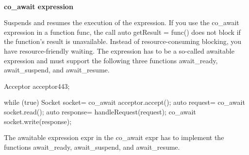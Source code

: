 \noindent
\\\textbf{co\_await expression}

Suspends and resumes the execution of the expression. If you use the co\_await expression in a function func, the call auto getResult = func() does not block if the function’s result is unavailable. Instead of resource-consuming blocking, you have resource-friendly waiting. The expression has to be a so-called awaitable expression and must support the following three functions await\_ready, await\_suspend, and await\_resume.


\begin{cpp}
Acceptor acceptor{443};

while (true){
	Socket socket= co_await acceptor.accept();
	auto request= co_await socket.read();
	auto response= handleRequest(request);
	co_await socket.write(response);
}
\end{cpp}

The awaitable expression expr in the co\_await expr has to implement the functions await\_ready, await\_suspend, and await\_resume.






















